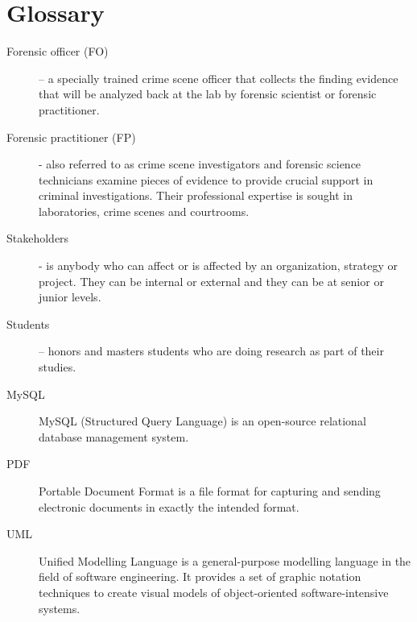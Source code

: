 \documentclass[10pt,a4paper]{article}
\begin{document}
\section{Glossary}
\begin{description}
	\item [Forensic officer (FO)] – a specially trained crime scene officer that collects the finding evidence that will be analyzed back at the lab by forensic scientist or forensic practitioner. 
	\item [Forensic practitioner (FP)] - also referred to as crime scene investigators and forensic science technicians examine pieces of evidence to provide crucial support in criminal investigations. Their professional expertise is sought in laboratories, crime scenes and courtrooms.
	\item [Stakeholders] - is anybody who can affect or is affected by an organization, strategy or project. They can be internal or external and they can be at senior or junior levels.
	\item [Students] – honors and masters students who are doing research as part of their studies.
	\item[MySQL] MySQL (Structured Query Language) is an open-source relational database management system.
	
	\item[PDF] Portable Document Format is a file format for capturing and sending electronic documents in exactly the intended format.
	\item[UML] Unified Modelling Language is a general-purpose modelling language in the field of software engineering. It provides a set of graphic notation techniques to create visual models of object-oriented software-intensive systems. 
	

\end{description}
\end{document}
